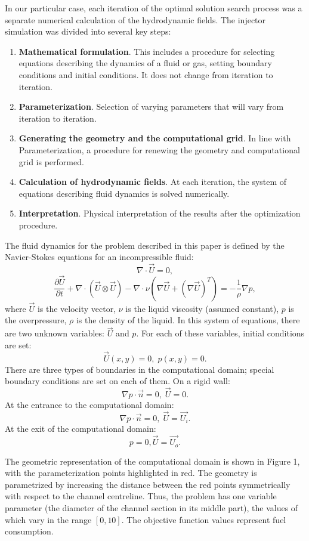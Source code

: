 \documentclass{aip-cp}
\begin{document}
In our particular case, each iteration of the optimal solution search process was a separate numerical calculation of the hydrodynamic fields. The injector simulation was divided into several key steps:
\begin{enumerate}
\item \textbf{Mathematical formulation}. This includes a procedure for selecting equations describing the dynamics of a fluid or gas, setting boundary conditions and initial conditions. It does not change from iteration to iteration.
\item \textbf{Parameterization}. Selection of varying parameters that will vary from iteration to iteration.
\item \textbf{Generating the geometry and the computational grid}. In line with Parameterization, a procedure for renewing the geometry and computational grid is performed.
\item \textbf{Calculation of hydrodynamic fields}. At each iteration, the system of equations describing fluid dynamics is solved numerically.
\item \textbf{Interpretation}. Physical interpretation of the results after the optimization procedure.
\end{enumerate}

The fluid dynamics for the problem described in this paper is defined by the Navier-Stokes equations for an incompressible fluid:
\[
\nabla \cdot \vec{U} = 0,
\]
\[
\frac{\partial \vec{U}}{\partial t} + \nabla \cdot \left( \vec{U} \otimes \vec{U}\right) - \nabla \cdot \nu \left( \nabla \vec{U} + (\nabla \vec{U})^T\right) = - \frac{1}{\rho} \nabla p,
\]
where $\vec{U}$ is the velocity vector, $\nu$  is the liquid viscosity (assumed constant), $p$  is the overpressure, $\rho$ is the density of the liquid. In this system of equations, there are two unknown variables: $\vec{U}$  and $p$. For each of these variables, initial conditions are set: 
\[
\vec{U}(x,y) = 0, \; p(x,y) = 0.
\]
There are three types of boundaries in the computational domain; special boundary conditions are set on each of them. 
On a rigid wall:
\[
\nabla p \cdot \vec{n} = 0, \; \vec{U} = 0.
\]
At the entrance to the computational domain:
\[
\nabla p \cdot \vec{n} = 0, \; \vec{U} = \vec{U_i}.
\]
At the exit of the computational domain:
\[
 p = 0, \vec{U} = \vec{U_o}.
\]

The geometric representation of the computational domain is shown in Figure 1, with the parameterization points highlighted in red. The geometry is parametrized by increasing the distance between the red points symmetrically with respect to the channel centreline. 
Thus, the problem has one variable parameter (the diameter of the channel section in its middle part), the values of which vary in the range $[0,10]$. The objective function values represent fuel consumption.
\end{document}
